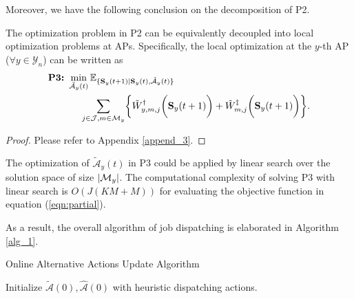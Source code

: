 Moreover, we have the following conclusion on the decomposition of P2.
\begin{lemma}[]
    The optimization problem in P2 can be equivalently decoupled into local optimization problems at APs.
    Specifically, the local optimization at the $y$-th AP ($\forall y\in\mathcal{Y}_{n}$) can be written as
    {\small
    \begin{align}
        \textbf{P3:}~
        &\min_{ \tilde{\mathcal{A}}_{y}(t) }
        \mathbb{E}_{\set{ \Stat_{y}(t+1)|\Stat_{y}(t), \tilde{\mathcal{A}}_{y}(t) }}
        \nonumber\\
        &~~~~\sum_{j\in\jSpace,m\in\esSet_{y}} \Brace{
            \tilde{W}^{\AP}_{y,m,j}\Paren{\Stat_{y}(t+1)}
            +\tilde{W}^{\ES}_{m,j}\Paren{\Stat_{y}(t+1)}
        }.
        \label{eqn:partial}
    \end{align}
    }
    \label{lemma:w_partial}
\end{lemma}
\begin{proof}
    Please refer to Appendix \ref{append_3}.
\end{proof}

The optimization of $\tilde{\mathcal{A}}_{y}(t)$ in P3 could be applied by linear search over the solution space of size $|\mathcal{M}_{y}|$.
The computational complexity of solving P3 with linear search is $O(J(KM+M))$ for evaluating the objective function in equation (\ref{eqn:partial}).

As a result, the overall algorithm of job dispatching is elaborated in Algorithm \ref{alg_1}.
\begin{algorithm}[ht]
    \caption{Online Alternative Actions Update Algorithm}\label{alg_1}
    \DontPrintSemicolon %

    Initialize $\tilde{\mathcal{A}}(0),\hat{\mathcal{A}}(0)$ with heuristic dispatching actions.\;
\end{algorithm}

